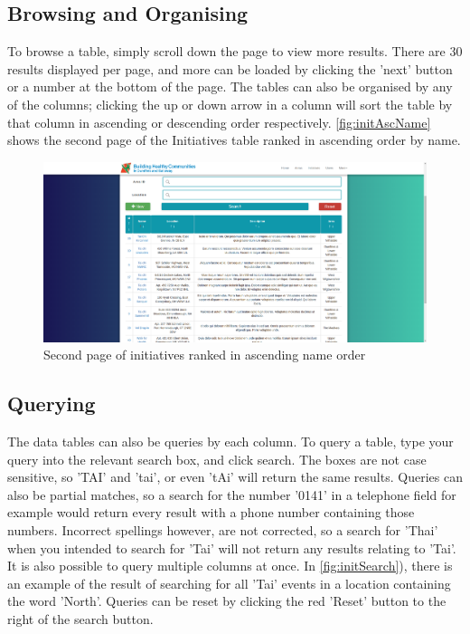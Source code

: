 \documentclass{bhcguides}
\begin{document}
\subsection{Browsing and Organising}
\label{ssec:browsingtables}

To browse a table, simply scroll down the page to view more results. There are 30 results displayed per page, and more can be loaded by clicking the 'next' button or a number at the bottom of the page. The tables can also be organised by any of the columns; clicking the up or down arrow in a column will sort the table by that column in ascending or descending order respectively. \autoref{fig:initAscName} shows the second page of the Initiatives table ranked in ascending order by name.

\begin{figure}[h!]
 \centerline{\includegraphics[width=\textwidth, height=\textheight, keepaspectratio]{initiativesnameascending.png}}
 \caption{Second page of initiatives ranked in ascending name order}
 \label{fig:initAscName}
\end{figure}

\subsection{Querying}
\label{ssec:search}

The data tables can also be queries by each column. To query a table, type your query into the relevant search box, and click search. The boxes are not case sensitive, so 'TAI' and 'tai', or even 'tAi' will return the same results. Queries can also be partial matches, so a search for the number '0141' in a telephone field for example would return every result with a phone number containing those numbers. Incorrect spellings however, are not corrected, so a search for 'Thai' when you intended to search for 'Tai' will not return any results relating to 'Tai'. It is also possible to query multiple columns at once. In \autoref{fig:initSearch}), there is an example of the result of searching for all 'Tai' events in a location containing the word 'North'. Queries can be reset by clicking the red 'Reset' button to the right of the search button.
\end{document}
